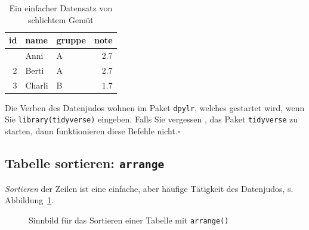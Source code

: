 \documentclass[
  a4paper,
]{scrbook}
\theoremstyle{definition}
\theoremstyle{definition}
\theoremstyle{definition}
\theoremstyle{remark}
\begin{document}
\begin{longtable}{rllr}

\caption{\label{tbl-datenjudo}Ein einfacher Datensatz von schlichtem
Gemüt}

\tabularnewline

\toprule
id & name & gruppe & note \\ 
\midrule\addlinespace[2.5pt]
1 & Anni & A & 2.7 \\ 
2 & Berti & A & 2.7 \\ 
3 & Charli & B & 1.7 \\ 
\bottomrule

\end{longtable}

\begin{tcolorbox}[enhanced jigsaw, colbacktitle=quarto-callout-important-color!10!white, bottomrule=.15mm, left=2mm, breakable, rightrule=.15mm, coltitle=black, title=\textcolor{quarto-callout-important-color}{\faExclamation}\hspace{0.5em}{Wichtig}, colback=white, leftrule=.75mm, titlerule=0mm, opacityback=0, bottomtitle=1mm, toprule=.15mm, arc=.35mm, toptitle=1mm, opacitybacktitle=0.6, colframe=quarto-callout-important-color-frame]

Die Verben des Datenjudos wohnen im Paket \texttt{dpylr}, welches
gestartet wird, wenn Sie \texttt{library(tidyverse)} eingeben. Falls Sie
vergessen , das Paket \texttt{tidyverse} zu starten, dann funktionieren
diese Befehle nicht.\(\square\)

\end{tcolorbox}

\subsection{\texorpdfstring{Tabelle sortieren:
\texttt{arrange}}{Tabelle sortieren: arrange}}\label{tabelle-sortieren-arrange}

\emph{Sortieren} der Zeilen ist eine einfache, aber häufige Tätigkeit
des Datenjudos, s. Abbildung~\ref{fig-arrange}.

\begin{figure}


\caption{\label{fig-arrange}Sinnbild für das Sortieren einer Tabelle mit
\texttt{arrange()}}

\end{figure}%
\end{document}
